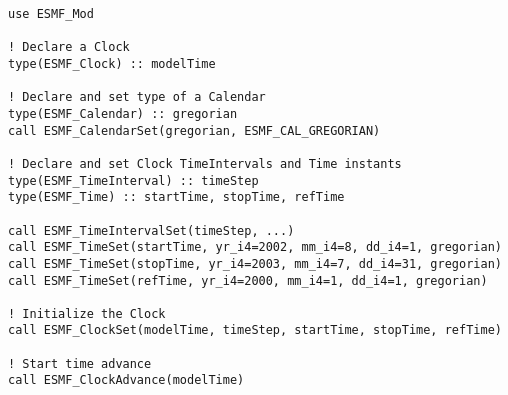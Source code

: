 
\begin{verbatim}
use ESMF_Mod

! Declare a Clock
type(ESMF_Clock) :: modelTime

! Declare and set type of a Calendar
type(ESMF_Calendar) :: gregorian
call ESMF_CalendarSet(gregorian, ESMF_CAL_GREGORIAN)

! Declare and set Clock TimeIntervals and Time instants
type(ESMF_TimeInterval) :: timeStep
type(ESMF_Time) :: startTime, stopTime, refTime

call ESMF_TimeIntervalSet(timeStep, ...)
call ESMF_TimeSet(startTime, yr_i4=2002, mm_i4=8, dd_i4=1, gregorian)
call ESMF_TimeSet(stopTime, yr_i4=2003, mm_i4=7, dd_i4=31, gregorian)
call ESMF_TimeSet(refTime, yr_i4=2000, mm_i4=1, dd_i4=1, gregorian)

! Initialize the Clock
call ESMF_ClockSet(modelTime, timeStep, startTime, stopTime, refTime)

! Start time advance
call ESMF_ClockAdvance(modelTime)
\end{verbatim}


